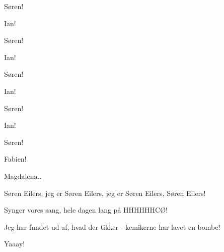 \documentclass[a4paper,11pt]{article}
\begin{document}
\begin{sketch}
 Søren!

 Ian!

 Søren!

 Ian!

 Søren!

 Ian!

 Søren!

 Ian!

 Søren!

 Fabien!

 Magdalena..


 Søren Eilers, jeg er Søren Eilers, jeg er Søren Eilers, Søren Eilers!

 Synger vores sang, hele dagen lang på HHHHHHCØ!

 Jeg har fundet ud af, hvad der tikker - kemikerne har lavet en bombe!

 Yaaay!


\end{sketch}
\end{document}
